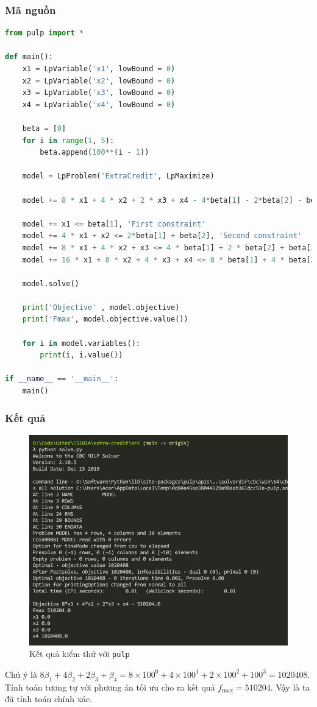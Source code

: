 \documentclass[12pt]{article}
\begin{document}
\subsubsection{Mã nguồn}
\begin{lstlisting}[language=Python]
from pulp import *

def main():
    x1 = LpVariable('x1', lowBound = 0)
    x2 = LpVariable('x2', lowBound = 0)
    x3 = LpVariable('x3', lowBound = 0)
    x4 = LpVariable('x4', lowBound = 0)

    beta = [0]
    for i in range(1, 5):
        beta.append(100**(i - 1))

    model = LpProblem('ExtraCredit', LpMaximize)

    model += 8 * x1 + 4 * x2 + 2 * x3 + x4 - 4*beta[1] - 2*beta[2] - beta[3] - .5*beta[4], 'fmax'

    model += x1 <= beta[1], 'First constraint'
    model += 4 * x1 + x2 <= 2*beta[1] + beta[2], 'Second constraint'
    model += 8 * x1 + 4 * x2 + x3 <= 4 * beta[1] + 2 * beta[2] + beta[3], 'Third coinstraint'
    model += 16 * x1 + 8 * x2 + 4 * x3 + x4 <= 8 * beta[1] + 4 * beta[2] + 2 * beta[3] + beta[4], 'Fourth coinstraint'

    model.solve()

    print('Objective' , model.objective)
    print('Fmax', model.objective.value())

    for i in model.variables():
        print(i, i.value())

if __name__ == '__main__':
    main()
\end{lstlisting}

\subsubsection{Kết quả}
\begin{figure}[H]
    \centering
    \includegraphics[scale=.85]{img/code-result.PNG}
    \caption{Kết quả kiểm thử với \texttt{pulp}}
    \label{fig:my_label}
\end{figure}
Chú ý là $8\beta_1 + 4\beta_2 + 2\beta_3 + \beta_4 = 8\times 100^0 + 4\times 100^1 + 2\times 100^2 + 100^3 = 1020408$. Tính toán tương tự với phương án tối ưu cho ra kết quả $f_{\max} = 510204$. Vậy là ta đã tính toán chính xác.
\end{document}

